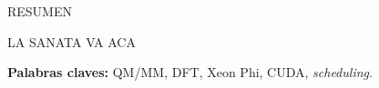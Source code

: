\begin{center}
\large \textsc{RESUMEN}
\end{center}
\vspace{1cm}

\noindent

LA SANATA VA ACA

\bigskip

\noindent\textbf{Palabras claves:} QM/MM, DFT, Xeon Phi, CUDA, \textit{scheduling}.
